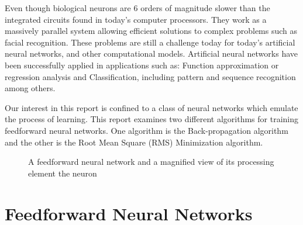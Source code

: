\documentclass[11pt]{article}
\begin{document}
Even though biological neurons are 6 orders of magnitude slower than the integrated circuits found in today's computer processors. They
work as a massively parallel system allowing efficient solutions to complex problems such as facial recognition. These problems are
still a challenge today for today's artificial neural networks, and other computational models. Artificial neural networks have been
successfully applied in applications such as: Function approximation or regression analysis and Classification, including pattern and
sequence recognition among others.

Our interest in this report is confined to a class of neural networks which emulate the process of learning. This report examines two
different algorithms for training feedforward neural networks. One algorithm is the Back-propagation algorithm and the other is the Root
Mean Square (RMS) Minimization algorithm.

\begin{figure}[]
	\centering
		\hspace{2mm} 
		\caption{A feedforward neural network and a magnified view of its processing element the neuron}
	\label{fig:figures_ffwdnn_Neuron}	
\end{figure}

\section{Feedforward Neural Networks} %
\label{sec:feedforward_neural_networks}
\end{document}
